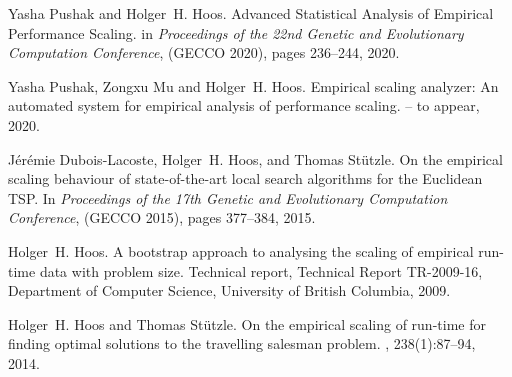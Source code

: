 
\begin{thebibliography}{1}

Yasha Pushak and Holger~H. Hoos.
\newblock Advanced Statistical Analysis of Empirical Performance Scaling.
\newblock in {\em Proceedings of the 22nd Genetic and Evolutionary Computation Conference}, (GECCO 2020), pages 236--244, 2020.

Yasha Pushak, Zongxu Mu and Holger~H. Hoos.
\newblock Empirical scaling analyzer: An automated system for empirical analysis of performance scaling.
 -- to appear, 2020.

J{\'e}r{\'e}mie Dubois-Lacoste, Holger~H. Hoos, and Thomas St{\"u}tzle.
\newblock On the empirical scaling behaviour of state-of-the-art local search
algorithms for the {E}uclidean {TSP}.
\newblock In {\em Proceedings of the 17th Genetic and Evolutionary Computation Conference}, (GECCO 2015), pages 377--384, 2015.

Holger~H. Hoos.
\newblock A bootstrap approach to analysing the scaling of empirical run-time
data with problem size.
\newblock Technical report, Technical Report TR-2009-16, Department of Computer Science, University of British
Columbia, 2009.

Holger~H. Hoos and Thomas St{\"u}tzle.
\newblock On the empirical scaling of run-time for finding optimal solutions to
the travelling salesman problem.
, 238(1):87--94, 2014.

\end{thebibliography}


